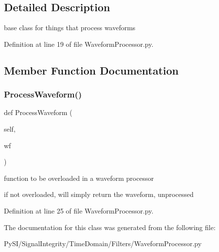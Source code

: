 \subsection{Detailed Description}
base class for things that process waveforms 

Definition at line 19 of file Waveform\+Processor.\+py.



\subsection{Member Function Documentation}
\mbox{\label{classSignalIntegrity_1_1TimeDomain_1_1Filters_1_1WaveformProcessor_1_1WaveformProcessor_ae09bec195c9cb1d5819e73b7be169b11}} 
\subsubsection{\texorpdfstring{Process\+Waveform()}{ProcessWaveform()}}
{\footnotesize\ttfamily def Process\+Waveform (\begin{DoxyParamCaption}\item[{}]{self,  }\item[{}]{wf }\end{DoxyParamCaption})}



function to be overloaded in a waveform processor 

if not overloaded, will simply return the waveform, unprocessed 

Definition at line 25 of file Waveform\+Processor.\+py.



The documentation for this class was generated from the following file\+:\begin{DoxyCompactItemize}
\item 
Py\+S\+I/\+Signal\+Integrity/\+Time\+Domain/\+Filters/Waveform\+Processor.\+py\end{DoxyCompactItemize}
